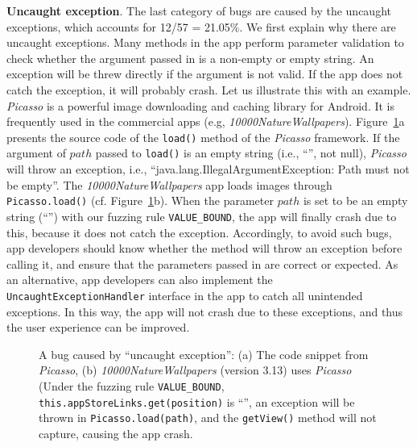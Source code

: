 \documentclass[sigconf,review, anonymous]{acmart}
\begin{document}
\textbf{Uncaught exception}. The last category of bugs are caused by the uncaught exceptions, which accounts for 12/57 = 21.05\%. We first explain why there are uncaught exceptions. Many methods in the app perform parameter validation to check whether the argument passed in is a non-empty or empty string. An exception will be threw directly if the argument is not valid. If the app does not catch the exception, it will probably crash. Let us illustrate this with an example. \textit{Picasso} is a powerful image downloading and caching library for Android. It is frequently used in the commercial apps (e.g, \textit{10000NatureWallpapers}). Figure~\ref{fig_bug3}a presents the source code of the \texttt{load()} method of the \textit{Picasso} framework. If the argument of $path$ passed to \texttt{load()} is an empty string (i.e., ``'', not null), \textit{Picasso} will throw an exception, i.e., ``java.lang.IllegalArgumentException: Path must not be empty''. The \textit{10000NatureWallpapers} app loads images through \texttt{Picasso.load()} (cf. Figure~\ref{fig_bug3}b). When the parameter $path$ is set to be an empty string (``'') with our fuzzing rule \texttt{VALUE\_BOUND}, the app will finally crash due to this, because it does not catch the exception. Accordingly, to avoid such bugs, app developers should know whether the method will throw an exception before calling it, and ensure that the parameters passed in are correct or expected. As an alternative, app developers can also implement the \texttt{UncaughtExceptionHandler} interface in the app to catch all unintended exceptions. In this way, the app will not crash due to these exceptions, and thus the user experience can be improved.

\begin{figure}
  \centering
 \subfigure[]{
    }
  \subfigure[]{
    }
  \caption{A bug caused by ``uncaught exception'': (a) The code snippet from \textit{Picasso}, (b) \textit{10000NatureWallpapers} (version 3.13) uses \textit{Picasso} (Under the fuzzing rule \texttt{VALUE\_BOUND}, \texttt{this.appStoreLinks.get(position)} is ``'', an exception will be thrown in \texttt{Picasso.load(path)}, and the \texttt{getView()} method will not capture, causing the app crash.}
\label{fig_bug3}
\end{figure}
\end{document}
